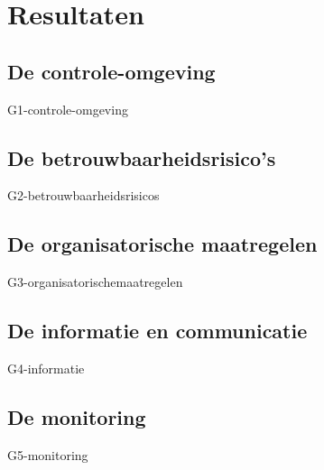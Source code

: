 \chapter{Resultaten}
\label{hoofdstuk:resultaten}
\section{De controle-omgeving}
{G1-controle-omgeving}


\section{De betrouwbaarheidsrisico's}
{G2-betrouwbaarheidsrisicos}

\section{De organisatorische maatregelen}
{G3-organisatorischemaatregelen}

\section{De informatie en communicatie}
{G4-informatie}

\section{De monitoring}
{G5-monitoring}